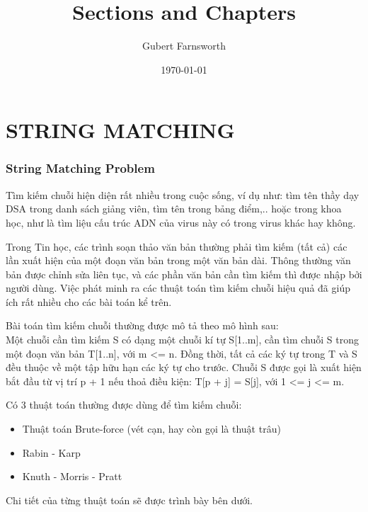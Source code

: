 \documentclass[a4paper,11pt]{article}
\title{Sections and Chapters}
\author{Gubert Farnsworth}
\date{\today}
\begin{document}
	\maketitle
	\part*{STRING MATCHING}
	
	\section{String Matching Problem}
	Tìm kiếm chuỗi hiện diện rất nhiều trong cuộc sống, ví dụ như: tìm tên thầy dạy DSA trong danh sách giảng viên,
	tìm tên trong bảng điểm,.. hoặc trong khoa học, như là tìm liệu cấu trúc ADN của virus này có trong virus khác hay không.

	Trong Tin học, các trình soạn thảo văn bản thường phải tìm kiếm (tất cả) các lần xuất hiện của một đoạn văn bản trong một văn bản dài. Thông thường văn bản được chỉnh sửa liên tục, và các phần văn bản cần tìm kiếm thì được nhập bởi người dùng. Việc phát minh ra các thuật toán tìm kiếm chuỗi hiệu quả đã giúp ích rất nhiều cho các bài toán kể trên.

	Bài toán tìm kiếm chuỗi thường được mô tả theo mô hình sau: \\
	Một chuỗi cần tìm kiếm S có dạng một chuỗi kí tự S[1..m], cần tìm chuỗi S trong một đoạn văn bản T[1..n], với m <= n. Đồng thời, tất cả các ký tự trong T và S đều thuộc về một tập hữu hạn các ký tự cho trước. Chuỗi S được gọi là xuất hiện bắt đầu từ vị trí p + 1 nếu thoả điều kiện: T[p + j] = S[j], với 1 <= j <= m.
	
	\vspace*{3mm}
	Có 3 thuật toán thường được dùng để tìm kiếm chuỗi:
	\begin{itemize}
	    \item Thuật toán Brute-force (vét cạn, hay còn gọi là thuật trâu)
	    \item Rabin - Karp
	    \item Knuth - Morris - Pratt
	\end{itemize}
	Chi tiết của từng thuật toán sẽ được trình bày bên dưới.
\end{document}

